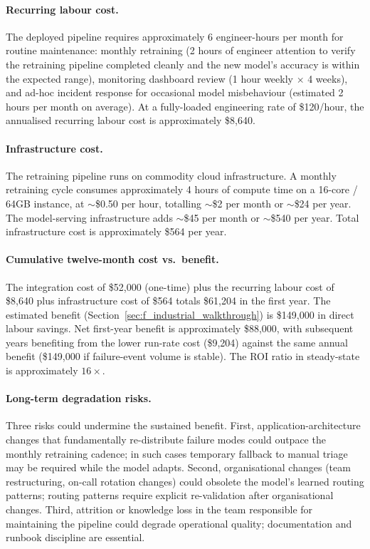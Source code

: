 \documentclass[11pt,a4paper]{article}
\begin{document}
\paragraph{Recurring labour cost.} The deployed pipeline requires approximately 6 engineer-hours per month for routine maintenance: monthly retraining (2 hours of engineer attention to verify the retraining pipeline completed cleanly and the new model's accuracy is within the expected range), monitoring dashboard review (1 hour weekly $\times$ 4 weeks), and ad-hoc incident response for occasional model misbehaviour (estimated 2 hours per month on average). At a fully-loaded engineering rate of \$120/hour, the annualised recurring labour cost is approximately \$8{,}640.

\paragraph{Infrastructure cost.} The retraining pipeline runs on commodity cloud infrastructure. A monthly retraining cycle consumes approximately 4 hours of compute time on a 16-core / 64GB instance, at $\sim$\$0.50 per hour, totalling $\sim$\$2 per month or $\sim$\$24 per year. The model-serving infrastructure adds $\sim$\$45 per month or $\sim$\$540 per year. Total infrastructure cost is approximately \$564 per year.

\paragraph{Cumulative twelve-month cost vs.\ benefit.} The integration cost of \$52{,}000 (one-time) plus the recurring labour cost of \$8{,}640 plus infrastructure cost of \$564 totals \$61{,}204 in the first year. The estimated benefit (Section~\ref{sec:f_industrial_walkthrough}) is \$149{,}000 in direct labour savings. Net first-year benefit is approximately \$88{,}000, with subsequent years benefiting from the lower run-rate cost (\$9{,}204) against the same annual benefit (\$149{,}000 if failure-event volume is stable). The ROI ratio in steady-state is approximately $16\times$.

\paragraph{Long-term degradation risks.} Three risks could undermine the sustained benefit. First, application-architecture changes that fundamentally re-distribute failure modes could outpace the monthly retraining cadence; in such cases temporary fallback to manual triage may be required while the model adapts. Second, organisational changes (team restructuring, on-call rotation changes) could obsolete the model's learned routing patterns; routing patterns require explicit re-validation after organisational changes. Third, attrition or knowledge loss in the team responsible for maintaining the pipeline could degrade operational quality; documentation and runbook discipline are essential.
\end{document}
